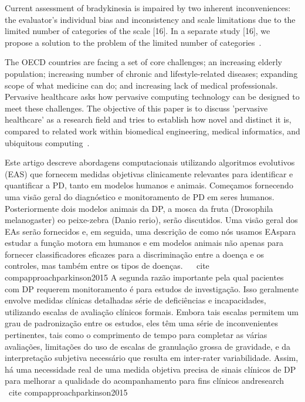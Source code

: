 Current assessment of bradykinesia is impaired by two inherent inconveniences: the evaluator’s individual bias and inconsistency and scale limitations due to the limited number of categories of the scale [16]. In a separate study [16], we propose a solution to the problem of the limited number of categories~\cite{bradmonitor2015}.


The OECD countries are facing a set of core challenges; an increasing elderly population; increasing number of chronic and lifestyle-related diseases; expanding scope of what medicine can do; and increasing lack of medical professionals. Pervasive healthcare asks how pervasive computing technology can be designed to meet these challenges. The objective of this paper is to discuss 'pervasive healthcare' as a research field and tries to establish how novel and distinct it is, compared to related work within biomedical engineering, medical informatics, and ubiquitous computing~\cite{bardram2008}.


Este artigo descreve abordagens computacionais utilizando algoritmos evolutivos (EAS) que fornecem medidas objetivas clinicamente relevantes para identificar e quantificar a PD, tanto em modelos humanos e animais. Começamos fornecendo uma visão geral do diagnóstico e monitoramento de PD em seres humanos. Posteriormente dois modelos animais da DP, a mosca da fruta (Drosophila melanogaster) eo peixe-zebra (Danio rerio), serão discutidos. Uma visão geral dos EAs serão fornecidos e, em seguida, uma descrição de como nós usamos EAspara estudar a função motora em humanos e em modelos animais não apenas para fornecer classificadores eficazes para a discriminação entre a doença e os controles, mas também entre os tipos de doenças. ~ \ cite {compapproachparkinson2015}
A segunda razão importante pela qual pacientes com DP requerem monitoramento é para estudos de investigação. Isso geralmente envolve medidas clínicas detalhadas série de deficiências e incapacidades, utilizando escalas de avaliação clínicos formais. Embora tais escalas permitem um grau de padronização entre os estudos, eles têm uma série de inconvenientes pertinentes, tais como o comprimento de tempo para completar as várias avaliações, limitações do uso de escalas de granulação grossa de gravidade, e da interpretação subjetiva necessário que resulta em inter-rater variabilidade. Assim, há uma necessidade real de uma medida objetiva precisa de sinais clínicos de DP para melhorar a qualidade do acompanhamento para fins clínicos andresearch ~ \ cite {compapproachparkinson2015}

